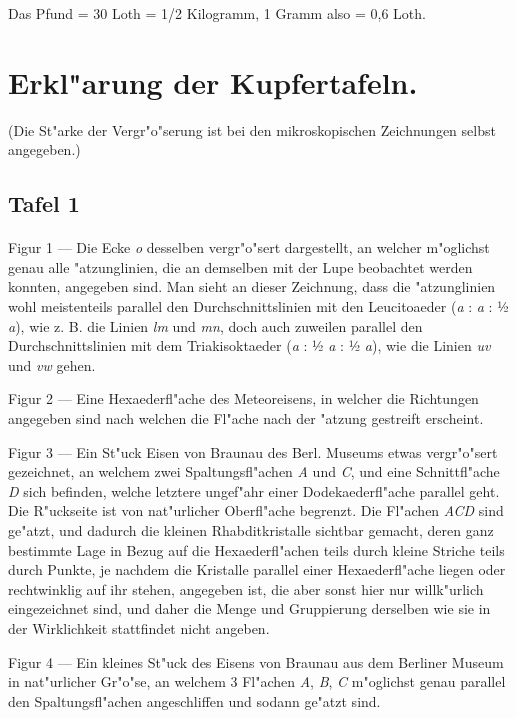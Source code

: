 \documentclass[a4paper, 11pt, oneside]{article}
\begin{document}
\begin{center}
Das Pfund = 30 Loth = 1/2 Kilogramm, 1 Gramm also = 0,6 Loth.
\end{center}
\clearpage
\section{Erkl"arung der Kupfertafeln.}
\begin{center}
(Die St"arke der Vergr"o"serung ist bei den mikroskopischen Zeichnungen selbst angegeben.)
\end{center}
\subsection{Tafel 1}
\paragraph{}
Figur 1 --- Die Ecke \emph{o} desselben vergr"o"sert dargestellt, an welcher m"oglichst genau alle "atzunglinien, die an demselben mit der Lupe beobachtet werden konnten, angegeben sind. Man sieht an dieser Zeichnung, dass die "atzunglinien wohl meistenteils parallel den Durchschnittslinien mit den Leucitoaeder (\emph{a} : \emph{a} : ½ \emph{a}), wie z. B. die Linien \emph{lm} und \emph{mn}, doch auch zuweilen parallel den Durchschnittslinien mit dem Triakisoktaeder (\emph{a} : ½ \emph{a} : ½ \emph{a}), wie die Linien \emph{uv} und \emph{vw} gehen.

Figur 2 --- Eine Hexaederfl"ache des Meteoreisens, in welcher die Richtungen angegeben sind nach welchen die Fl"ache nach der "atzung gestreift erscheint.

Figur 3 --- Ein St"uck Eisen von Braunau des Berl. Museums etwas vergr"o"sert gezeichnet, an welchem zwei Spaltungsfl"achen \emph{A} und \emph{C}, und eine Schnittfl"ache \emph{D} sich befinden, welche letztere ungef"ahr einer Dodekaederfl"ache parallel geht. Die R"uckseite ist von nat"urlicher Oberfl"ache begrenzt. Die Fl"achen \emph{ACD} sind ge"atzt, und dadurch die kleinen Rhabditkristalle sichtbar gemacht, deren ganz bestimmte Lage in Bezug auf die Hexaederfl"achen teils durch kleine Striche teils durch Punkte, je nachdem die Kristalle parallel einer Hexaederfl"ache liegen oder rechtwinklig auf ihr stehen, angegeben ist, die aber sonst hier nur willk"urlich eingezeichnet sind, und daher die Menge und Gruppierung derselben wie sie in der Wirklichkeit stattfindet nicht angeben.

Figur 4 --- Ein kleines St"uck des Eisens von Braunau aus dem Berliner Museum in nat"urlicher Gr"o"se, an welchem 3 Fl"achen \emph{A}, \emph{B}, \emph{C} m"oglichst genau parallel den Spaltungsfl"achen angeschliffen und sodann ge"atzt sind.
\end{document}
